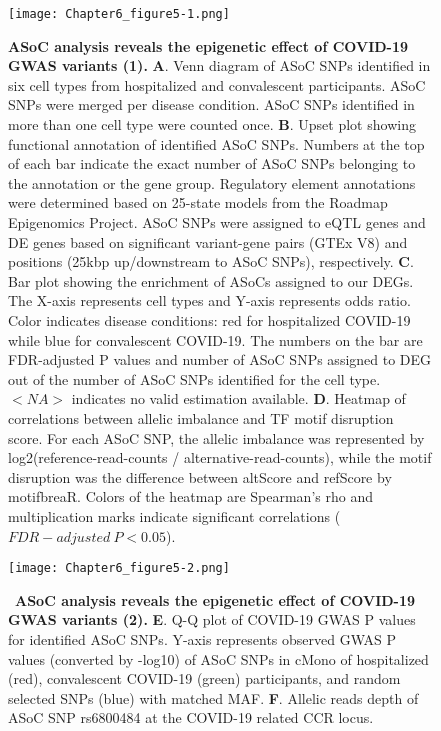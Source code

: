 \documentclass{book}
\begin{document}
\begin{refsection}
\begin{landscape}
\begin{figure}%
  \centering
  \texttt{[image: Chapter6\_figure5-1.png]}
  \caption{\label{fig:chp6fig5}
    \textbf{ASoC analysis reveals the epigenetic effect of COVID-19 GWAS variants (1).}
    \scriptsize
    \textbf{A}. Venn diagram of ASoC SNPs identified in six cell types from hospitalized and convalescent participants. ASoC SNPs were merged per disease condition. ASoC SNPs identified in more than one cell type were counted once.
    \textbf{B}. Upset plot showing functional annotation of identified ASoC SNPs. Numbers at the top of each bar indicate the exact number of ASoC SNPs belonging to the annotation or the gene group. Regulatory element annotations were determined based on 25-state models from the Roadmap Epigenomics Project. ASoC SNPs were assigned to eQTL genes and DE genes based on significant variant-gene pairs (GTEx V8) and positions (25kbp up/downstream to ASoC SNPs), respectively.
    \textbf{C}. Bar plot showing the enrichment of ASoCs assigned to our DEGs. The X-axis represents cell types and Y-axis represents odds ratio. Color indicates disease conditions: red for hospitalized COVID-19 while blue for convalescent COVID-19. The numbers on the bar are FDR-adjusted P values and number of ASoC SNPs assigned to DEG out of the number of ASoC SNPs identified for the cell type. $<NA>$ indicates no valid estimation available.
    \textbf{D}. Heatmap of correlations between allelic imbalance and TF motif disruption score. For each ASoC SNP, the allelic imbalance was represented by log2(reference-read-counts / alternative-read-counts), while the motif disruption was the difference between altScore and refScore by motifbreaR. Colors of the heatmap are Spearman’s rho and multiplication marks indicate significant correlations ($FDR-adjusted~P < 0.05$).
  }
\end{figure}
\end{landscape}
\begin{figure}%
  \centering
  \addtocounter{figure}{-1}
  \texttt{[image: Chapter6\_figure5-2.png]}
  \caption{
    ~\textbf{ASoC analysis reveals the epigenetic effect of COVID-19 GWAS variants (2).}
    \textbf{E}. Q-Q plot of COVID-19 GWAS P values for identified ASoC SNPs. Y-axis represents observed GWAS P values (converted by -log10) of ASoC SNPs in cMono of hospitalized (red), convalescent COVID-19 (green) participants, and random selected SNPs (blue) with matched MAF.
    \textbf{F}. Allelic reads depth of ASoC SNP rs6800484 at the COVID-19 related CCR locus.
}
\end{figure}
\end{refsection}
\end{document}

